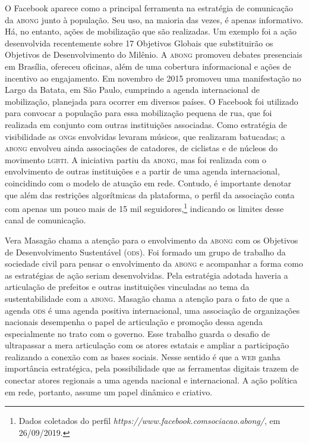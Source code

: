 O Facebook aparece como a principal ferramenta na estratégia de
comunicação da \textsc{abong} junto à população. Seu uso, na maioria das vezes, é
apenas informativo. Há, no entanto, ações de mobilização que são
realizadas. Um exemplo foi a ação desenvolvida recentemente sobre 17
Objetivos Globais que substituirão os Objetivos de Desenvolvimento do
Milênio. A \textsc{abong} promoveu debates presenciais em Brasília, ofereceu
oficinas, além de uma cobertura informacional e ações de incentivo ao
engajamento. Em novembro de 2015 promoveu uma manifestação no Largo da
Batata, em São Paulo, cumprindo a agenda internacional de mobilização,
planejada para ocorrer em diversos países. O Facebook foi utilizado para
convocar a população para essa mobilização pequena de rua, que foi
realizada em conjunto com outras instituições associadas. Como
estratégia de visibilidade as \textsc{ong}s envolvidas levaram músicos, que
realizaram batucadas; a \textsc{abong} envolveu ainda associações de catadores,
de ciclistas e de núcleos do movimento \textsc{lgbti}. A iniciativa partiu da
\textsc{abong}, mas foi realizada com o envolvimento de outras instituições e a
partir de uma agenda internacional, coincidindo com o modelo de atuação
em rede. Contudo, é importante denotar que além das restrições
algorítmicas da plataforma, o perfil da associação conta com apenas um
pouco mais de 15 mil seguidores,\footnote{Dados coletados do perfil
  \emph{https://www.facebook.comsociacao.abong/},
  em 26/09/2019.} indicando os limites desse canal de comunicação.

Vera Masagão chama a atenção para o envolvimento da \textsc{abong} com os
Objetivos de Desenvolvimento Sustentável (\textsc{ods}). Foi formado um grupo de
trabalho da sociedade civil para pensar o envolvimento da \textsc{abong} e
acompanhar a forma como as estratégias de ação seriam desenvolvidas.
Pela estratégia adotada haveria a articulação de prefeitos e outras
instituições vinculadas ao tema da sustentabilidade com a \textsc{abong}. Masagão
chama a atenção para o fato de que a agenda \textsc{ods} é uma agenda positiva
internacional, uma associação de organizações nacionais desempenha o
papel de articulação e promoção dessa agenda especialmente no trato com
o governo. Esse trabalho guarda o desafio de ultrapassar a mera
articulação com os atores estatais e ampliar a participação realizando a
conexão com as bases sociais. Nesse sentido é que a \textsc{web} ganha
importância estratégica, pela possibilidade que as ferramentas digitais
trazem de conectar atores regionais a uma agenda nacional e
internacional. A ação política em rede, portanto, assume um papel
dinâmico e criativo.

